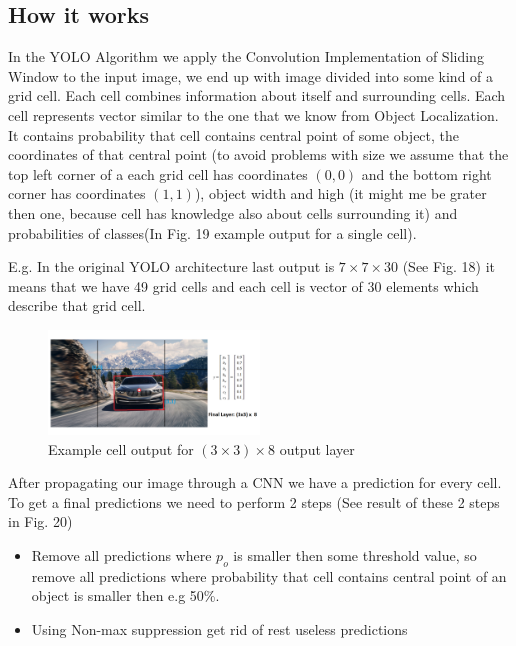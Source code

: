 \documentclass[letterpaper, 10 pt, conference]{ieeeconf}  %
\begin{document}
\subsection{How it works}
In the YOLO Algorithm we apply the Convolution Implementation of Sliding Window to the input image, we end up with image divided into some kind of a grid cell. Each cell combines information about itself and surrounding cells. Each cell represents vector similar to the one that we know from Object Localization. It contains probability that cell contains central point of some object, the coordinates of that central point (to avoid problems with size we assume that the top left corner of a each grid cell has coordinates $(0,0)$ and  the bottom right corner has coordinates $(1,1)$), object width and high (it might me be grater then one, because cell has knowledge also about cells surrounding it) and probabilities of classes(In Fig. 19 example output for a single cell). 

E.g. In the original YOLO architecture last output is $7 \times 7 \times 30$ (See Fig. 18) it means that we have 49 grid cells and each cell is vector of 30 elements which describe that grid cell. 

\begin{figure}[!ht]
	\centering
    \includegraphics[width=0.5\textwidth]{Pictures/YOLOExampleOutput2.png}
	\caption{Example cell output for $ (3\times 3) \times 8$ output layer}
\end{figure}

After propagating our image through a CNN we have a prediction for every cell. To get a final predictions we need to perform 2 steps (See result of these 2 steps in Fig. 20)

\begin{itemize}

\item Remove all predictions where $p_o$ is smaller then some threshold value, so remove all predictions where probability that cell contains central point of an object is smaller then e.g 50\%.  

\item Using Non-max suppression get rid of rest useless predictions
\end{itemize}
\end{document}
